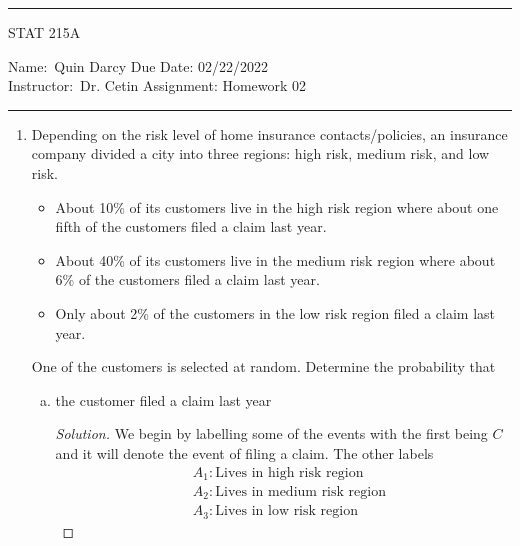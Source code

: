\documentclass[12pt]{article}
\newenvironment{solution}
{\renewcommand\qedsymbol{$\blacksquare$}\begin{proof}[Solution]}
{\end{proof}}
\begin{document}
    \thispagestyle{empty}\hrule

    \begin{center}
        \vspace{.4cm} { \large STAT 215A}
    \end{center}
    {Name:\ Quin Darcy \hspace{\fill} Due Date: 02/22/2022   \\
    { Instructor:}\ Dr. Cetin \hspace{\fill} Assignment:
    Homework 02 \\ \hrule}

    \begin{enumerate}
        \item Depending on the risk level of home insurance contacts/policies,
            an insurance company divided a city into three regions: high risk,
            medium risk, and low risk.
            \begin{itemize}
                \item About 10\% of its customers live in the high risk region
                    where about one fifth of the customers filed a claim last
                    year.
                \item About 40\% of its customers live in the medium risk
                    region where about 6\% of the customers filed a claim last
                    year. 
                \item Only about 2\% of the customers in the low risk region
                    filed a claim last year. 
            \end{itemize}
            One of the customers is selected at random. Determine the
            probability that 
            \begin{enumerate}[(a)]
                \item the customer filed a claim last year
                    \begin{solution}
                        We begin by labelling some of the events with the first
                        being $C$ and it will denote the event of filing
                        a claim. The other labels
                        \begin{align*}
                            &A_1:\text{Lives in high risk region} \\
                            &A_2:\text{Lives in medium risk region} \\
                            &A_3:\text{Lives in low risk region}
                        \end{align*}

\end{solution}
\end{enumerate}
\end{enumerate}
\end{document}
